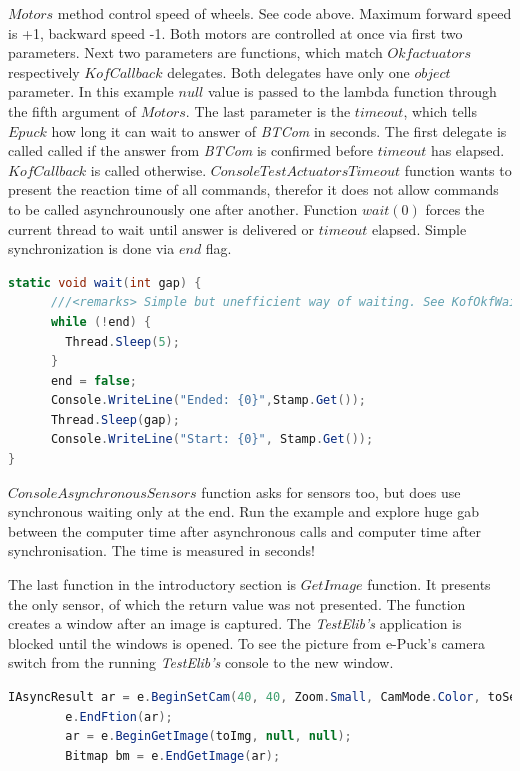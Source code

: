 \documentclass[12pt,notitlepage]{report}
\begin{document}
	$Motors$ method control speed of wheels. See code above. Maximum forward speed is +1, backward speed -1. 
	Both motors are controlled at once via first two parameters.
	Next two parameters are functions, which match $Okfactuators$ respectively $KofCallback$ delegates. 
	Both delegates have only one $object$ parameter. In this example $null$ value is passed
	to the lambda function through the fifth argument of $Motors$. The last parameter is the $timeout$, 
	which tells $Epuck$ how long it can wait to answer of {\it BTCom} in seconds.
	The first delegate is called called if the answer from {\it BTCom} is confirmed before $timeout$ has elapsed. 
	$KofCallback$ is called otherwise.
	$ConsoleTestActuatorsTimeout$ function wants to present the reaction time of all commands, 
	therefor it does not allow commands to be called asynchrounously one after another.
	Function $wait(0)$ forces the current thread to wait until answer is delivered
	or $timeout$ elapsed. Simple synchronization is done via $end$ flag.
\begin{lstlisting}[language=cs]
static void wait(int gap) {
      ///<remarks> Simple but unefficient way of waiting. See KofOkfWaiting(..) in Behaviour for usage of EventWaitHandle.</remarks>
      while (!end) { 
        Thread.Sleep(5); 
      } 
      end = false; 
      Console.WriteLine("Ended: {0}",Stamp.Get());
      Thread.Sleep(gap);
      Console.WriteLine("Start: {0}", Stamp.Get());
}
\end{lstlisting}

	$ConsoleAsynchronousSensors$ function asks for sensors too, but does use synchronous waiting only at the end. Run the example and explore huge gab
	between the computer time after asynchronous calls and computer time after synchronisation. 
	The time is measured in seconds!
	
	The last function in the introductory section is $GetImage$ function. 
	It presents the only sensor, of which the return value was not presented.
	The function creates a window after an image is captured. 
	The {\it TestElib's} application is blocked until the windows is opened. To see the picture from
	e-Puck's camera switch from the running {\it TestElib's} console to the new window.


\begin{lstlisting}[language=cs]
	IAsyncResult ar = e.BeginSetCam(40, 40, Zoom.Small, CamMode.Color, toSetCam, null, null);
        e.EndFtion(ar);
        ar = e.BeginGetImage(toImg, null, null);
        Bitmap bm = e.EndGetImage(ar);	
\end{lstlisting}
\end{document}
